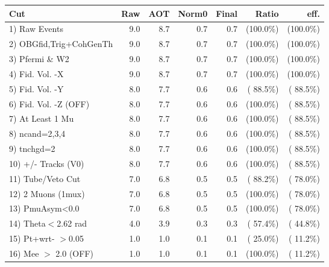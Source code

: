  \begin{table}[h!]\centering
 \begin{tabular}{||l||r|r|r|r|r|r||}
 \hline
 \hline
 Cut & Raw & AOT & Norm0 & Final & Ratio & eff.       \\
 \hline
  1) Raw Events           &          9.0 &          8.7 &          0.7 &          0.7 & (100.0\%) & (100.0\%) \\
  2) OBGfid,Trig+CohGenTh &          9.0 &          8.7 &          0.7 &          0.7 & (100.0\%) & (100.0\%) \\
  3) Pfermi \& W2         &          9.0 &          8.7 &          0.7 &          0.7 & (100.0\%) & (100.0\%) \\
  4) Fid. Vol. -X         &          9.0 &          8.7 &          0.7 &          0.7 & (100.0\%) & (100.0\%) \\
  5) Fid. Vol. -Y         &          8.0 &          7.7 &          0.6 &          0.6 & ( 88.5\%) & ( 88.5\%) \\
  6) Fid. Vol. -Z (OFF)   &          8.0 &          7.7 &          0.6 &          0.6 & (100.0\%) & ( 88.5\%) \\
  7) At Least 1 Mu        &          8.0 &          7.7 &          0.6 &          0.6 & (100.0\%) & ( 88.5\%) \\
  8) ncand=2,3,4          &          8.0 &          7.7 &          0.6 &          0.6 & (100.0\%) & ( 88.5\%) \\
  9) tnchgd=2             &          8.0 &          7.7 &          0.6 &          0.6 & (100.0\%) & ( 88.5\%) \\
 10) +/- Tracks (V0)      &          8.0 &          7.7 &          0.6 &          0.6 & (100.0\%) & ( 88.5\%) \\
 11) Tube/Veto Cut        &          7.0 &          6.8 &          0.5 &          0.5 & ( 88.2\%) & ( 78.0\%) \\
 12) 2 Muons (1mux)       &          7.0 &          6.8 &          0.5 &          0.5 & (100.0\%) & ( 78.0\%) \\
 13) PmuAsym<0.0          &          7.0 &          6.8 &          0.5 &          0.5 & (100.0\%) & ( 78.0\%) \\
 14) Theta$<$2.62 rad     &          4.0 &          3.9 &          0.3 &          0.3 & ( 57.4\%) & ( 44.8\%) \\
 15) Pt+wrt- $>$0.05      &          1.0 &          1.0 &          0.1 &          0.1 & ( 25.0\%) & ( 11.2\%) \\
 16) Mee $>$ 2.0  (OFF)   &          1.0 &          1.0 &          0.1 &          0.1 & (100.0\%) & ( 11.2\%) \\

\end{tabular}
\end{table}
